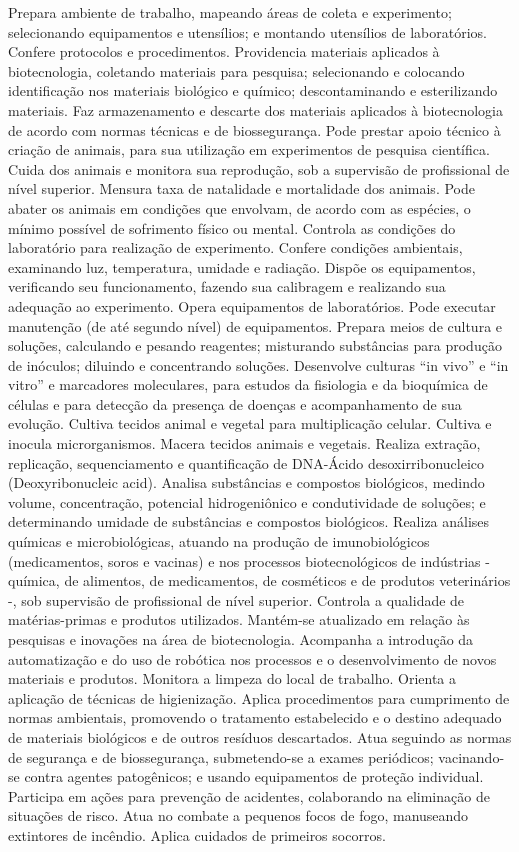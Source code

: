 \documentclass[
]{article}
\begin{document}
Prepara ambiente de trabalho, mapeando áreas de coleta e experimento;
selecionando equipamentos e utensílios; e montando utensílios de
laboratórios. Confere protocolos e procedimentos. Providencia materiais
aplicados à biotecnologia, coletando materiais para pesquisa;
selecionando e colocando identificação nos materiais biológico e
químico; descontaminando e esterilizando materiais. Faz armazenamento e
descarte dos materiais aplicados à biotecnologia de acordo com normas
técnicas e de biossegurança. Pode prestar apoio técnico à criação de
animais, para sua utilização em experimentos de pesquisa científica.
Cuida dos animais e monitora sua reprodução, sob a supervisão de
profissional de nível superior. Mensura taxa de natalidade e mortalidade
dos animais. Pode abater os animais em condições que envolvam, de acordo
com as espécies, o mínimo possível de sofrimento físico ou mental.
Controla as condições do laboratório para realização de experimento.
Confere condições ambientais, examinando luz, temperatura, umidade e
radiação. Dispõe os equipamentos, verificando seu funcionamento, fazendo
sua calibragem e realizando sua adequação ao experimento. Opera
equipamentos de laboratórios. Pode executar manutenção (de até segundo
nível) de equipamentos. Prepara meios de cultura e soluções, calculando
e pesando reagentes; misturando substâncias para produção de inóculos;
diluindo e concentrando soluções. Desenvolve culturas ``in vivo'' e ``in
vitro'' e marcadores moleculares, para estudos da fisiologia e da
bioquímica de células e para detecção da presença de doenças e
acompanhamento de sua evolução. Cultiva tecidos animal e vegetal para
multiplicação celular. Cultiva e inocula microrganismos. Macera tecidos
animais e vegetais. Realiza extração, replicação, sequenciamento e
quantificação de DNA-Ácido desoxirribonucleico (Deoxyribonucleic acid).
Analisa substâncias e compostos biológicos, medindo volume,
concentração, potencial hidrogeniônico e condutividade de soluções; e
determinando umidade de substâncias e compostos biológicos. Realiza
análises químicas e microbiológicas, atuando na produção de
imunobiológicos (medicamentos, soros e vacinas) e nos processos
biotecnológicos de indústrias - química, de alimentos, de medicamentos,
de cosméticos e de produtos veterinários -, sob supervisão de
profissional de nível superior. Controla a qualidade de matérias-primas
e produtos utilizados. Mantém-se atualizado em relação às pesquisas e
inovações na área de biotecnologia. Acompanha a introdução da
automatização e do uso de robótica nos processos e o desenvolvimento de
novos materiais e produtos. Monitora a limpeza do local de trabalho.
Orienta a aplicação de técnicas de higienização. Aplica procedimentos
para cumprimento de normas ambientais, promovendo o tratamento
estabelecido e o destino adequado de materiais biológicos e de outros
resíduos descartados. Atua seguindo as normas de segurança e de
biossegurança, submetendo-se a exames periódicos; vacinando-se contra
agentes patogênicos; e usando equipamentos de proteção individual.
Participa em ações para prevenção de acidentes, colaborando na
eliminação de situações de risco. Atua no combate a pequenos focos de
fogo, manuseando extintores de incêndio. Aplica cuidados de primeiros
socorros.
\end{document}
